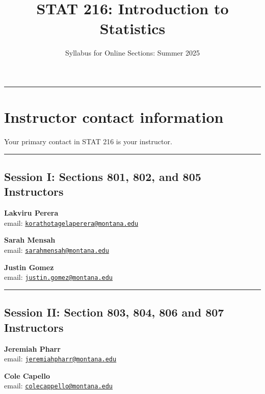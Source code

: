 \documentclass[
]{article}
\title{STAT 216: Introduction to Statistics}
\author{Syllabus for Online Sections: Summer 2025}
\date{}
\begin{document}
\maketitle

{
\setcounter{tocdepth}{3}
\tableofcontents
}
\begin{center}\rule{0.5\linewidth}{0.5pt}\end{center}

\section{Instructor contact
information}\label{instructor-contact-information}

Your primary contact in STAT 216 is your instructor.

\begin{center}\rule{0.5\linewidth}{0.5pt}\end{center}

\subsection{Session I: Sections 801, 802, and 805
Instructors}\label{session-i-sections-801-802-and-805-instructors}

\textbf{Lakviru Perera}\\
email:
\href{mailto:korathotagelaperera@montana.edu}{\nolinkurl{korathotagelaperera@montana.edu}}

\textbf{Sarah Mensah}\\
email:
\href{mailto:sarahmensah@montana.edu}{\nolinkurl{sarahmensah@montana.edu}}

\textbf{Justin Gomez}\\
email:
\href{mailto:justin.gomez@montana.edu}{\nolinkurl{justin.gomez@montana.edu}}

\begin{center}\rule{0.5\linewidth}{0.5pt}\end{center}

\subsection{Session II: Section 803, 804, 806 and 807
Instructors}\label{session-ii-section-803-804-806-and-807-instructors}

\textbf{Jeremiah Pharr}\\
email:
\href{mailto:jeremiahpharr@montana.edu}{\nolinkurl{jeremiahpharr@montana.edu}}

\textbf{Cole Capello}\\
email:
\href{mailto:colecappello@montana.edu}{\nolinkurl{colecappello@montana.edu}}
\end{document}
